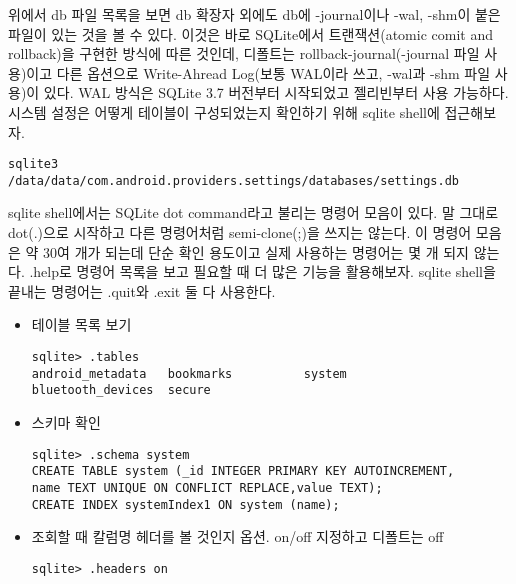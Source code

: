 위에서 db 파일 목록을 보면 db 확장자 외에도 db에 -journal이나 -wal, -shm이 붙은 파일이 있는 것을 볼 수 있다.
이것은 바로 SQLite에서 트랜잭션(atomic comit and rollback)을 구현한 방식에 따른 것인데, 디폴트는 rollback-journal(-journal 파일 사용)이고 다른 옵션으로 Write-Ahread Log(보통 WAL이라 쓰고, -wal과 -shm 파일 사용)이 있다.
WAL 방식은 SQLite 3.7 버전부터 시작되었고 젤리빈부터 사용 가능하다.\\ 

시스템 설정은 어떻게 테이블이 구성되었는지 확인하기 위해 sqlite shell에 접근해보자.
\begin{lstlisting}[frame=single] 
sqlite3 /data/data/com.android.providers.settings/databases/settings.db
\end{lstlisting}

sqlite shell에서는 SQLite dot command라고 불리는 명령어 모음이 있다.
말 그대로 dot(.)으로 시작하고 다른 명령어처럼 semi-clone(;)을 쓰지는 않는다. 
이 명령어 모음은 약 30여 개가 되는데 단순 확인 용도이고 실제 사용하는 명령어는 몇 개 되지 않는다.
.help로 명령어 목록을 보고 필요할 때 더 많은 기능을 활용해보자.
sqlite shell을 끝내는 명령어는 .quit와 .exit 둘 다 사용한다.
\begin{itemize}
\item 테이블 목록 보기
\begin{lstlisting}[frame=single] 
sqlite> .tables       
android_metadata   bookmarks          system           
bluetooth_devices  secure       
\end{lstlisting}

\item 스키마 확인
\begin{lstlisting}[frame=single] 
sqlite> .schema system
CREATE TABLE system (_id INTEGER PRIMARY KEY AUTOINCREMENT,
name TEXT UNIQUE ON CONFLICT REPLACE,value TEXT);
CREATE INDEX systemIndex1 ON system (name);
\end{lstlisting}

\item 조회할 때 칼럼명 헤더를 볼 것인지 옵션. on/off 지정하고 디폴트는 off
\begin{lstlisting}[frame=single] 
sqlite> .headers on 
\end{lstlisting}
\end{itemize}

